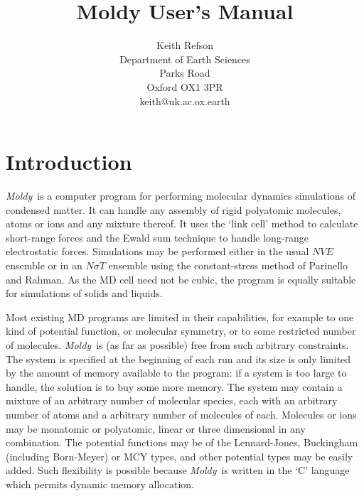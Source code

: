 \oddsidemargin=0.5in
\textwidth=6in
\textheight=8.5in
\title{{\Huge Moldy User's Manual}}
\author{Keith Refson\\Department of Earth Sciences\\Parks Road
\\Oxford OX1 3PR\\keith@uk.ac.ox.earth\\}

\newcommand{\moldy}{{\em Moldy}}
\newcommand{\etc}{{\em etc}}
\newcommand{\eg}{{\em e.g.\ }}
\newcommand{\ie}{{\em i.e.\ }}
\newcommand{\bm}[1]{\mbox{\boldmath \protect\(#1\protect\)}}

\maketitle
\tableofcontents

\chapter{Introduction}

\moldy\  is a computer program for performing molecular dynamics
simulations of condensed matter.  It can handle any assembly of rigid
polyatomic molecules, atoms or ions and any mixture thereof. It uses
the `link cell' method to calculate short-range forces and the Ewald
sum technique to handle long-range electrostatic forces.  Simulations
may be performed either in the usual $NVE$ ensemble or in an $N\sigma
T$ ensemble using the constant-stress method of Parinello and Rahman.
As the MD cell need not be cubic, the program is equally suitable for
simulations of solids and liquids.

Most existing MD programs are limited in their capabilities, for
example to one kind of potential function, or molecular symmetry, or
to some restricted number of molecules.  \moldy\  is (as far as
possible) free from such arbitrary constraints.  The system is
specified at the beginning of each run and its size is only limited by
the amount of memory available to the program: if a system is too
large to handle, the solution is to buy some more memory.  The system
may contain a mixture of an arbitrary number of molecular species,
each with an arbitrary number of atoms and a arbitrary number of
molecules of each. Molecules or ions may be monatomic or polyatomic,
linear or three dimensional in any combination.  The potential
functions may be of the Lennard-Jones, Buckingham (including
Born-Meyer) or MCY types, and other potential types may be easily
added.  Such flexibility is possible because \moldy\  is written in the
`C' language which permits dynamic memory allocation.

